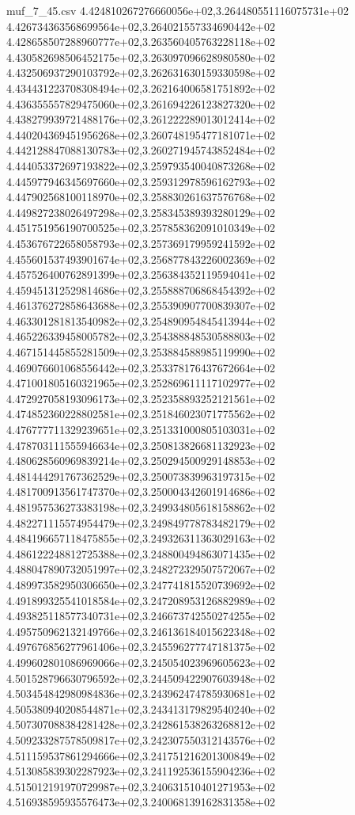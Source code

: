 \begin{filecontents*}{muf_7_45.csv}
4.424810267276660056e+02,3.264480551116075731e+02
4.426734363568699564e+02,3.264021557334690442e+02
4.428658507288960777e+02,3.263560405763228118e+02
4.430582698506452175e+02,3.263097096628980580e+02
4.432506937290103792e+02,3.262631630159330598e+02
4.434431223708308494e+02,3.262164006581751892e+02
4.436355557829475060e+02,3.261694226123827320e+02
4.438279939721488176e+02,3.261222289013012414e+02
4.440204369451956268e+02,3.260748195477181071e+02
4.442128847088130783e+02,3.260271945743852484e+02
4.444053372697193822e+02,3.259793540040873268e+02
4.445977946345697660e+02,3.259312978596162793e+02
4.447902568100118970e+02,3.258830261637576768e+02
4.449827238026497298e+02,3.258345389393280129e+02
4.451751956190700525e+02,3.257858362091010349e+02
4.453676722658058793e+02,3.257369179959241592e+02
4.455601537493901674e+02,3.256877843226002369e+02
4.457526400762891399e+02,3.256384352119594041e+02
4.459451312529814686e+02,3.255888706868454392e+02
4.461376272858643688e+02,3.255390907700839307e+02
4.463301281813540982e+02,3.254890954845413944e+02
4.465226339458005782e+02,3.254388848530588803e+02
4.467151445855281509e+02,3.253884588985119990e+02
4.469076601068556442e+02,3.253378176437672664e+02
4.471001805160321965e+02,3.252869611117102977e+02
4.472927058193096173e+02,3.252358893252121561e+02
4.474852360228802581e+02,3.251846023071775562e+02
4.476777711329239651e+02,3.251331000805103031e+02
4.478703111555946634e+02,3.250813826681132923e+02
4.480628560969839214e+02,3.250294500929148853e+02
4.481444291767362529e+02,3.250073839963197315e+02
4.481700913561747370e+02,3.250004342601914686e+02
4.481957536273383198e+02,3.249934805618158862e+02
4.482271115574954479e+02,3.249849778783482179e+02
4.484196657118475855e+02,3.249326311363029163e+02
4.486122248812725388e+02,3.248800494863071435e+02
4.488047890732051997e+02,3.248272329507572067e+02
4.489973582950306650e+02,3.247741815520739692e+02
4.491899325541018584e+02,3.247208953126882989e+02
4.493825118577340731e+02,3.246673742550274255e+02
4.495750962132149766e+02,3.246136184015622348e+02
4.497676856277961406e+02,3.245596277747181375e+02
4.499602801086969066e+02,3.245054023969605623e+02
4.501528796630796592e+02,3.244509422907603948e+02
4.503454842980984836e+02,3.243962474785930681e+02
4.505380940208544871e+02,3.243413179829540240e+02
4.507307088384281428e+02,3.242861538263268812e+02
4.509233287578509817e+02,3.242307550312143576e+02
4.511159537861294666e+02,3.241751216201300849e+02
4.513085839302287923e+02,3.241192536155904236e+02
4.515012191970729987e+02,3.240631510401271953e+02
4.516938595935576473e+02,3.240068139162831358e+02

\end{filecontents*}
